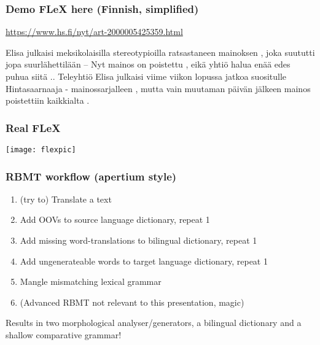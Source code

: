 \documentclass{beamer}
\begin{document}
\begin{frame}
    \frametitle{Demo FLeX here (Finnish, simplified)}
    \begin{tiny}\url{https://www.hs.fi/nyt/art-2000005425359.html}\end{tiny}
        Elisa
        julkais\only<2->{--}\alert<2-3>{i}
        meksikolais\alert<4-5>{i}\alert<4-5>{lla}
        stereotypio\alert<5>{i}\alert<5>{lla}
        ratsasta\alert<6-7>{ne}\alert<6-7>{en}
        mainokse\alert<8-9>{n}
        ,
        joka
        suututt\only<3->{--}\alert<3>{i}
        jopa
        suurlähettilää\alert<9>{n}
        –
        Nyt
        mainos
        on
        poistet\alert<10>{tu}
        ,
        eikä
        yhtiö
        halua
        enää
        edes
        puhua
        sii\alert<11>{tä}
        ..
        Teleyhtiö
        Elisa
        julkais\only<3->{--}\alert<3>{i}
        viime
        viiko\alert<9>{n}
        lopu\alert<12>{ssa}
        jatko\alert<13>{a}
        suositu\alert<14>{lle}
        Hintasaarnaaja
        -
        mainossarja\only<14->{--}\alert<14>{lle}\alert<7>{en}
        ,
        mutta
        vain
        muutama\only<9->{--}\alert<9>{n}
        päivä\alert<9>{n}
        jälke\alert<7>{en}
        mainos
        poistet\alert<15>{tiin}
        kaikkialta
        .
\end{frame}

\begin{frame}
    \frametitle{Real FLeX}
    \texttt{[image: flexpic]}
\end{frame}


\begin{frame}
    \frametitle{RBMT workflow (apertium style)}
    \begin{enumerate}
        \item (try to) Translate a text
        \item Add OOVs to source language dictionary, repeat 1
        \item Add missing word-translations to bilingual dictionary, repeat 1
        \item Add ungenerateable words to target language dictionary, repeat 1
        \item Mangle mismatching lexical grammar
        \item (Advanced RBMT not relevant to this presentation, magic)
    \end{enumerate}
    Results in two morphological analyser/generators, a bilingual dictionary and
    a shallow comparative grammar!
\end{frame}
\end{document}
